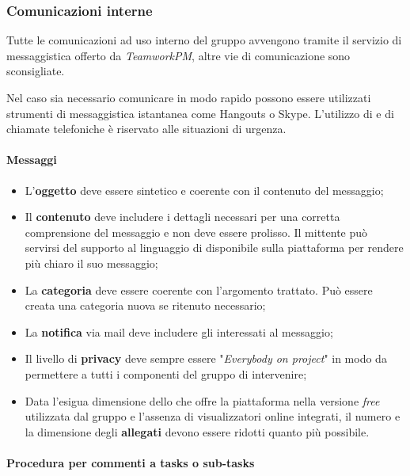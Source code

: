 \subsubsection{Comunicazioni interne}
\label{Comunicazioniinterne}

Tutte le comunicazioni ad uso interno del gruppo avvengono tramite il servizio di messaggistica offerto da \emph{TeamworkPM}, altre vie di comunicazione sono sconsigliate.

Nel caso sia necessario comunicare in modo rapido possono essere utilizzati strumenti di messaggistica istantanea come Hangouts o Skype. L'utilizzo di  e di chiamate telefoniche è riservato alle situazioni di urgenza.

\paragraph{Messaggi}
\label{Comunicazioniinternemessaggi}

\begin{itemize}
\item L'\textbf{oggetto} deve essere sintetico e coerente con il contenuto del messaggio;
\item Il \textbf{contenuto} deve includere i dettagli necessari per una corretta comprensione del messaggio e non deve essere prolisso. Il mittente può servirsi del supporto al linguaggio di  disponibile sulla piattaforma per rendere più chiaro il suo messaggio;
\item La \textbf{categoria} deve essere coerente con l'argomento trattato. Può essere creata una categoria nuova se ritenuto necessario;
\item La \textbf{notifica} via mail deve includere gli interessati al messaggio;
\item Il livello di \textbf{privacy} deve sempre essere "\textit{Everybody on project}" in modo da permettere a tutti i componenti del gruppo di intervenire;
\item Data l'esigua dimensione dello  che offre la piattaforma nella versione \textit{free} utilizzata dal gruppo e l'assenza di visualizzatori online integrati, il numero e la dimensione degli \textbf{allegati} devono essere ridotti quanto più possibile.
\end{itemize}

\paragraph{Procedura per commenti a tasks o sub-tasks}

